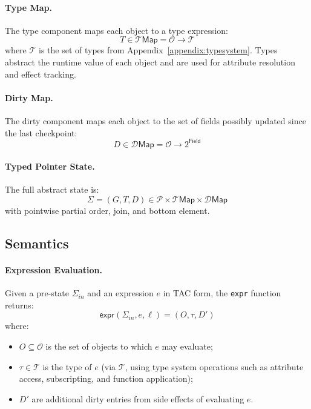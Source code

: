 \paragraph{Type Map.}
The type component maps each object to a type expression:
\[
T \in \mathcal{T}\mathsf{Map} = \mathcal{O} \to \mathcal{T}
\]
where $\mathcal{T}$ is the set of types from Appendix~\ref{appendix:typesystem}.  
Types abstract the runtime value of each object and are used for attribute resolution and effect tracking.

\paragraph{Dirty Map.}
The dirty component maps each object to the set of fields possibly updated since the last checkpoint:
\[
D \in \mathcal{D}\mathsf{Map} = \mathcal{O} \to 2^{\mathsf{Field}}
\]

\paragraph{Typed Pointer State.}
The full abstract state is:
\[
\Sigma = (G, T, D) \in \mathcal{P} \times \mathcal{T}\mathsf{Map} \times \mathcal{D}\mathsf{Map}
\]
with pointwise partial order, join, and bottom element.

\subsection{Semantics}

\paragraph{Expression Evaluation.}
Given a pre-state $\Sigma_{\mathit{in}}$ and an expression $e$ in TAC form, the \texttt{expr} function returns:
\[
\mathsf{expr}(\Sigma_{\mathit{in}}, e, \ell) = (O, \tau, D')
\]
where:
\begin{itemize}
\item $O \subseteq \mathcal{O}$ is the set of objects to which $e$ may evaluate;
\item $\tau \in \mathcal{T}$ is the type of $e$ (via $\mathcal{T}$, using type system operations such as attribute access, subscripting, and function application);
\item $D'$ are additional dirty entries from side effects of evaluating $e$.
\end{itemize}

